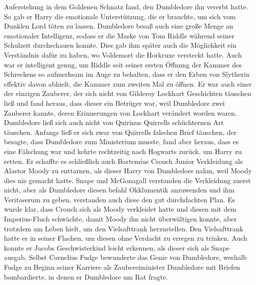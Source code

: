\documentclass[a4paper, 10pt]{article}
\begin{document}
Auferstehung in dem Goldenen Schnatz fand, den Dumbledore ihn vererbt hatte. So gab er Harry die emotionale Unterstützung, die er brauchte, um sich vom Dunklen Lord töten zu lassen. Dumbledore besaß auch eine große Menge an emotionaler Intelligenz, sodass er die Maske von Tom Riddle während seiner Schulzeit durchschauen konnte. Dies gab ihm später auch die Möglichkeit ein Verständnis dafür zu haben, wo Voldemort die Horkruxe versteckt hatte. Auch war er intelligent genug, um Riddle seit seiner ersten Öffnung der Kammer des Schreckens so aufmerksam im Auge zu behalten, dass er den Erben von Slytherin effektiv davon abhielt, die Kammer zum zweiten Mal zu öffnen. Er war auch einer der einzigen Zauberer, der sich nicht von Gilderoy Lockhart Geschichten täuschen ließ und fand heraus, dass dieser ein Betrüger war, weil Dumbledore zwei Zauberer kannte, deren Erinnerungen von Lockhart verändert worden waren. Dumbledore ließ sich auch nicht von Quirinus Quirrells schüchternen Art täuschen. Anfangs ließ er sich zwar von Quirrells falschen Brief täuschen, der besagte, dass Dumbledore zum Ministerium musste, fand aber heraus, dass es eine Fälschung war und kehrte rechtzeitig nach Hogwarts zurück, um Harry zu retten. Er schaffte es schließlich auch Bartemius Crouch Junior Verkleidung als Alastor Moody zu enttarnen, als dieser Harry von Dumbledore nahm, weil Moody dies nie gemacht hatte. Snape und McGonagall verstanden die Verkleidung zuerst nicht, aber als Dumbledore diesen befahl Okklumentik anzuwenden und ihm Veritaserum zu geben, verstanden auch diese den gut durchdachten Plan. Es wurde klar, dass Crouch sich als Moody verkleidet hatte und diesen mit dem Imperius-Fluch schwächte, damit Moody ihn nicht überwältigen konnte, aber trotzdem am Leben hielt, um den Vielsafttrank herzustellen. Den Vielsafttrank hatte er in seiner Flachen, um diesen ohne Verdacht zu erregen zu trinken. Auch konnte er Jacobs Geschwisterkind leicht erkennen, als dieser sich als Snape ausgab. Selbst Cornelius Fudge bewunderte das Genie von Dumbledore, weshalb Fudge zu Beginn seiner Karriere als Zaubereiminister Dumbledore mit Briefen bombardierte, in denen er Dumbledore um Rat fragte.
\end{document}
